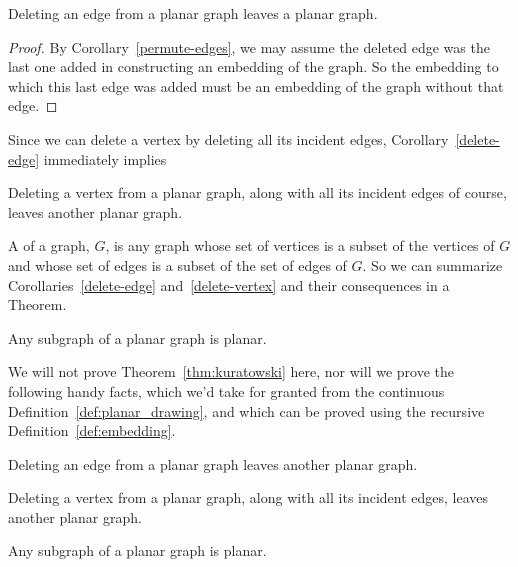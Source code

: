 \begin{editingnotes}
\begin{corollary}\label{delete-edge}
Deleting an edge from a planar graph leaves a planar graph.

\begin{proof}
  By Corollary~\ref{permute-edges}, we may assume the deleted edge was the
  last one added in constructing an embedding of the graph.  So the
  embedding to which this last edge was added must be an embedding of the
  graph without that edge.
\end{proof}

\end{corollary}

Since we can delete a vertex by deleting all its incident edges,
Corollary~\ref{delete-edge} immediately implies

\begin{corollary}\label{delete-vertex}
Deleting a vertex from a planar graph, along with all its incident
edges of course, leaves another planar graph.
\end{corollary}

A  of a graph, $G$, is any graph whose set of vertices is a
subset of the vertices of $G$ and whose set of edges is a subset of the
set of edges of $G$.  So we can summarize Corollaries~\ref{delete-edge}
and~\ref{delete-vertex} and their consequences in a Theorem.

\begin{theorem}\label{planar-subgraph}
  Any subgraph of a planar graph is planar.
\end{theorem}

\end{editingnotes}

We will not prove Theorem~\ref{thm:kuratowski} here, nor will we
prove the following handy facts, which we'd take for granted from the
continuous Definition~\ref{def:planar_drawing}, and which can be proved
using the recursive Definition~\ref{def:embedding}.

\begin{lemma}\label{lem:deleting_planar_edge}
Deleting an edge from a planar graph leaves another planar graph.
\end{lemma}

\begin{corollary}\label{delete-vertex}
Deleting a vertex from a planar graph, along with all its incident
edges, leaves another planar graph.
\end{corollary}

\begin{theorem}\label{planar-subgraph}
  Any subgraph of a planar graph is planar.
\end{theorem}

